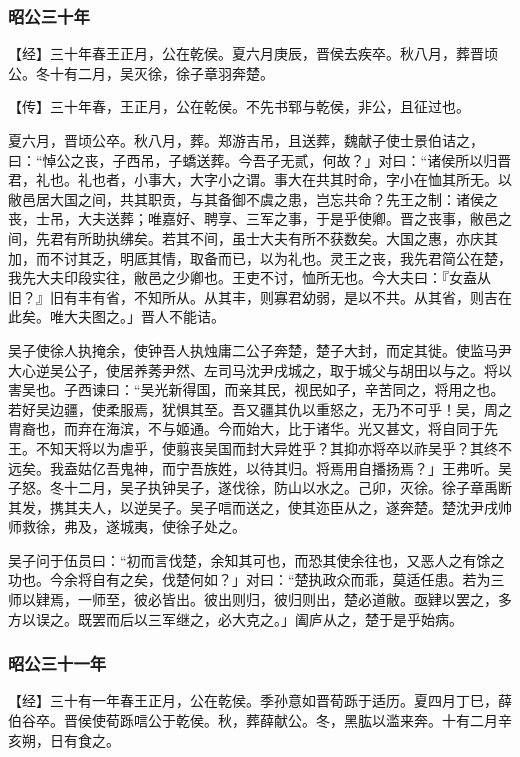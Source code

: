 \documentclass[]{article}
\begin{document}
\hypertarget{header-n2842}{%
\subsubsection{昭公三十年}\label{header-n2842}}

【经】三十年春王正月，公在乾侯。夏六月庚辰，晋侯去疾卒。秋八月，葬晋顷公。冬十有二月，吴灭徐，徐子章羽奔楚。

【传】三十年春，王正月，公在乾侯。不先书郓与乾侯，非公，且征过也。

夏六月，晋顷公卒。秋八月，葬。郑游吉吊，且送葬，魏献子使士景伯诘之，曰：``悼公之丧，子西吊，子蟜送葬。今吾子无贰，何故？」对曰：``诸侯所以归晋君，礼也。礼也者，小事大，大字小之谓。事大在共其时命，字小在恤其所无。以敝邑居大国之间，共其职贡，与其备御不虞之患，岂忘共命？先王之制：诸侯之丧，士吊，大夫送葬；唯嘉好、聘享、三军之事，于是乎使卿。晋之丧事，敝邑之间，先君有所助执绋矣。若其不间，虽士大夫有所不获数矣。大国之惠，亦庆其加，而不讨其乏，明厎其情，取备而已，以为礼也。灵王之丧，我先君简公在楚，我先大夫印段实往，敝邑之少卿也。王吏不讨，恤所无也。今大夫曰：『女盍从旧？』旧有丰有省，不知所从。从其丰，则寡君幼弱，是以不共。从其省，则吉在此矣。唯大夫图之。」晋人不能诘。

吴子使徐人执掩余，使钟吾人执烛庸二公子奔楚，楚子大封，而定其徙。使监马尹大心逆吴公子，使居养莠尹然、左司马沈尹戌城之，取于城父与胡田以与之。将以害吴也。子西谏曰：``吴光新得国，而亲其民，视民如子，辛苦同之，将用之也。若好吴边疆，使柔服焉，犹惧其至。吾又疆其仇以重怒之，无乃不可乎！吴，周之胄裔也，而弃在海滨，不与姬通。今而始大，比于诸华。光又甚文，将自同于先王。不知天将以为虐乎，使翦丧吴国而封大异姓乎？其抑亦将卒以祚吴乎？其终不远矣。我盍姑亿吾鬼神，而宁吾族姓，以待其归。将焉用自播扬焉？」王弗听。吴子怒。冬十二月，吴子执钟吴子，遂伐徐，防山以水之。己卯，灭徐。徐子章禹断其发，携其夫人，以逆吴子。吴子唁而送之，使其迩臣从之，遂奔楚。楚沈尹戌帅师救徐，弗及，遂城夷，使徐子处之。

吴子问于伍员曰：``初而言伐楚，余知其可也，而恐其使余往也，又恶人之有馀之功也。今余将自有之矣，伐楚何如？」对曰：``楚执政众而乖，莫适任患。若为三师以肄焉，一师至，彼必皆出。彼出则归，彼归则出，楚必道敝。亟肄以罢之，多方以误之。既罢而后以三军继之，必大克之。」阖庐从之，楚于是乎始病。

\hypertarget{header-n2850}{%
\subsubsection{昭公三十一年}\label{header-n2850}}

【经】三十有一年春王正月，公在乾侯。季孙意如晋荀跞于适历。夏四月丁巳，薛伯谷卒。晋侯使荀跞唁公于乾侯。秋，葬薛献公。冬，黑肱以滥来奔。十有二月辛亥朔，日有食之。
\end{document}
